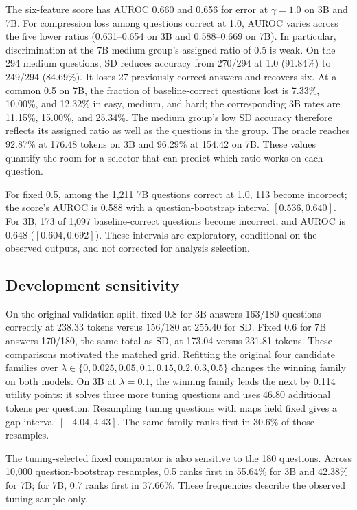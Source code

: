 \documentclass[a4paper,runningheads]{llncs}
\begin{document}
The six-feature score has AUROC 0.660 and 0.656 for error at $\gamma=1.0$ on 3B and 7B. For compression loss among questions correct at 1.0, AUROC varies across the five lower ratios (0.631--0.654 on 3B and 0.588--0.669 on 7B). In particular, discrimination at the 7B medium group's assigned ratio of 0.5 is weak. On the 294 medium questions, SD reduces accuracy from 270/294 at 1.0 (91.84\%) to 249/294 (84.69\%). It loses 27 previously correct answers and recovers six. At a common 0.5 on 7B, the fraction of baseline-correct questions lost is 7.33\%, 10.00\%, and 12.32\% in easy, medium, and hard; the corresponding 3B rates are 11.15\%, 15.00\%, and 25.34\%. The medium group's low SD accuracy therefore reflects its assigned ratio as well as the questions in the group. The oracle reaches 92.87\% at 176.48 tokens on 3B and 96.29\% at 154.42 on 7B. These values quantify the room for a selector that can predict which ratio works on each question.

For fixed 0.5, among the 1,211 7B questions correct at 1.0, 113 become incorrect; the score's AUROC is 0.588 with a question-bootstrap interval $[0.536,0.640]$. For 3B, 173 of 1,097 baseline-correct questions become incorrect, and AUROC is 0.648 ($[0.604,0.692]$). These intervals are exploratory, conditional on the observed outputs, and not corrected for analysis selection.

\subsection{Development sensitivity}
On the original validation split, fixed 0.8 for 3B answers 163/180 questions correctly at 238.33 tokens versus 156/180 at 255.40 for SD. Fixed 0.6 for 7B answers 170/180, the same total as SD, at 173.04 versus 231.81 tokens. These comparisons motivated the matched grid. Refitting the original four candidate families over $\lambda\in\{0,0.025,0.05,0.1,0.15,0.2,0.3,0.5\}$ changes the winning family on both models. On 3B at $\lambda=0.1$, the winning family leads the next by 0.114 utility points: it solves three more tuning questions and uses 46.80 additional tokens per question. Resampling tuning questions with maps held fixed gives a gap interval $[-4.04,4.43]$. The same family ranks first in 30.6\% of those resamples.

The tuning-selected fixed comparator is also sensitive to the 180 questions. Across 10,000 question-bootstrap resamples, 0.5 ranks first in 55.64\% for 3B and 42.38\% for 7B; for 7B, 0.7 ranks first in 37.66\%. These frequencies describe the observed tuning sample only.
\end{document}
